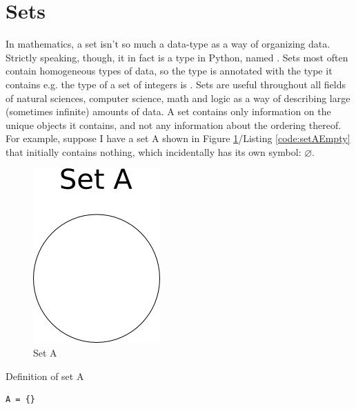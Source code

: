\section{Sets}\label{sec:sets}
In mathematics, a set isn't so much a data-type as a way of organizing data. Strictly speaking, though, it in fact is a type in Python, named . Sets most often contain homogeneous types of data, so the type is annotated with the type it contains e.g. the type of a set of integers is . Sets are useful throughout all fields of natural sciences, computer science, math and logic as a way of describing large (sometimes infinite) amounts of data. A set contains only information on the unique objects it contains, and not any information about the ordering thereof. For example, suppose I have a set A shown in Figure \ref{fig:setAEmpty}/Listing \ref{code:setAEmpty} that initially contains nothing, which incidentally has its own symbol: $\varnothing$.
\begin{center}
\begin{figure}[h]
\caption{Set A} \label{fig:setAEmpty}
\includegraphics[scale=0.5]{figures/setAEmpty.png}
\end{figure}
\end{center}

\begin{listing}[H]
\caption{Definition of set A}\label{code:setAEmpty}
\begin{verbatim}
A = {}
\end{verbatim}
\end{listing}

